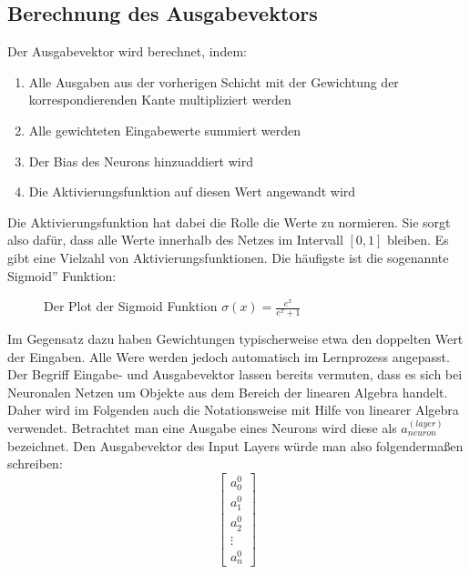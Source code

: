 \documentclass{article}
\begin{document}
\subsection{Berechnung des Ausgabevektors}
Der Ausgabevektor wird berechnet, indem:
\begin{enumerate}
	\item Alle Ausgaben aus der vorherigen Schicht mit der Gewichtung der korrespondierenden Kante multipliziert werden
	\item Alle gewichteten Eingabewerte summiert werden
	\item Der Bias des Neurons hinzuaddiert wird
	\item Die Aktivierungsfunktion auf diesen Wert angewandt wird
\end{enumerate}
Die Aktivierungsfunktion hat dabei die Rolle die Werte zu normieren. Sie sorgt also dafür, dass alle Werte innerhalb des Netzes im Intervall $[0, 1]$ bleiben. Es gibt eine Vielzahl von Aktivierungsfunktionen. Die häufigste ist die sogenannte \glqq Sigmoid'' Funktion:
\begin{figure}[h]
\begin{center}
\end{center}
\caption{Der Plot der Sigmoid Funktion $\sigma(x)=\frac{e^x}{e^x+1}$}
\end{figure}
\newline
Im Gegensatz dazu haben Gewichtungen typischerweise etwa den doppelten Wert der Eingaben. Alle Were werden jedoch automatisch im Lernprozess angepasst.
\newline
Der Begriff Eingabe- und Ausgabevektor lassen bereits vermuten, dass es sich bei Neuronalen Netzen um Objekte aus dem Bereich der linearen Algebra handelt. Daher wird im Folgenden auch die Notationsweise mit Hilfe von linearer Algebra verwendet. Betrachtet man eine Ausgabe eines Neurons wird diese als $a^ {(layer)}_{neuron}$ bezeichnet. Den Ausgabevektor des Input Layers würde man also folgendermaßen schreiben:
\begin{equation*}
\begin{bmatrix}
	a^0_0\\
	a^0_1\\
	a^0_2\\
	\vdots\\
	a^0_n
\end{bmatrix}
\end{equation*}
\end{document}
